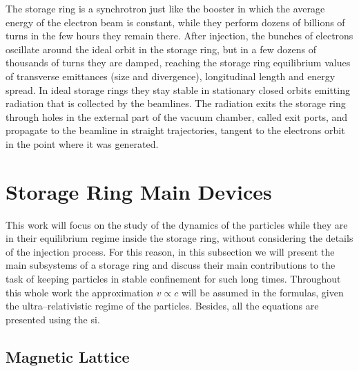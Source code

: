     The storage ring is a synchrotron just like the booster in which the average energy of the electron beam is constant, while they perform dozens of billions of turns in the few hours they remain there. After injection, the bunches of electrons oscillate around the ideal orbit in the storage ring, but in a few dozens of thousands of turns they are damped, reaching the storage ring equilibrium values of transverse emittances (size and divergence), longitudinal length and energy spread. In ideal storage rings they stay stable in stationary closed orbits emitting radiation that is collected by the beamlines. The radiation exits the storage ring through holes in the external part of the vacuum chamber, called exit ports, and propagate to the beamline in straight trajectories, tangent to the electrons orbit in the point where it was generated.

\section{Storage Ring Main Devices} \label{sec:storage_ring_main_devices}

    This work will focus on the study of the dynamics of the particles while they are in their equilibrium regime inside the storage ring, without considering the details of the injection process. For this reason, in this subsection we will present the main subsystems of a storage ring and discuss their main contributions to the task of keeping particles in stable confinement for such long times. Throughout this whole work the approximation $v\propto c$ will be assumed in the formulas, given the ultra--relativistic regime of the particles. Besides, all the equations are presented using the \gls{si}.

\subsection{Magnetic Lattice}

